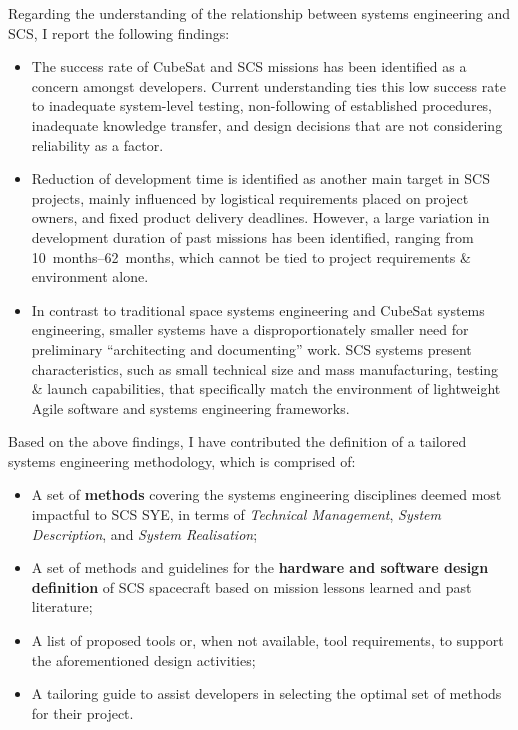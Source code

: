 \documentclass[a4paper,nobib,justified,final]{tufte-book}
\begin{document}
\begin{fullwidth}
Regarding the understanding of the relationship between systems engineering and \acl{SCS}, I report the following findings:
\begin{itemize}[itemsep=-2pt]
	\item The success rate of CubeSat and \acs{SCS} missions has been identified as a concern amongst developers. Current understanding ties this low success rate to inadequate system-level testing, non-following of established procedures, inadequate knowledge transfer, and design decisions that are not considering reliability as a factor.
	\item Reduction of development time is identified as another main target in \acs{SCS} projects, mainly influenced by logistical requirements placed on project owners, and fixed product delivery deadlines. However, a large variation in development duration of past missions has been identified, ranging from \qtyrange{10}{62}{months}, which cannot be tied to project requirements \& environment alone.
	\item 
	In contrast to traditional space systems engineering and CubeSat systems engineering, smaller systems have a disproportionately smaller need for preliminary ``architecting and documenting'' work.
	\acl{SCS} systems present characteristics, such as small technical size and mass manufacturing, testing \& launch capabilities, that specifically match the environment of lightweight Agile software and systems engineering frameworks.
\end{itemize}

Based on the above findings, I have contributed the definition of a tailored systems engineering methodology, which is comprised of:
\begin{itemize}[itemsep=-2pt]
	\item A set of \textbf{methods} covering the systems engineering disciplines deemed most impactful to \acs{SCS} \acl{SYE}, in terms of \emph{Technical Management}, \emph{System Description}, and \emph{System Realisation};
	\item A set of methods and guidelines for the \textbf{hardware and software design definition} of \acs{SCS} spacecraft based on mission lessons learned and past literature;
	\item A list of proposed tools or, when not available, tool requirements, to support the aforementioned design activities;
	\item A tailoring guide to assist developers in selecting the optimal set of methods for their project.
\end{itemize}


\end{fullwidth}
\end{document}
